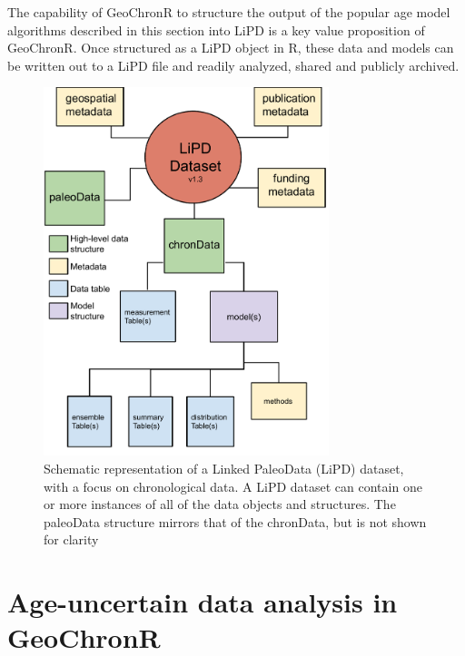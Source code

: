 \documentclass[gchron, manuscript]{copernicus}
\begin{document}
The capability of GeoChronR to structure the output of the popular age model algorithms described in this section into LiPD is a key value proposition of GeoChronR.
Once structured as a LiPD object in R, these data and models can be written out to a LiPD file and readily analyzed, shared and publicly archived.

\begin{figure}
\includegraphics[width=8.3cm]{LPD schematic 1.3 - chronData} \caption{Schematic representation of a Linked PaleoData (LiPD) dataset, with a focus on chronological data. A LiPD dataset can contain one or more instances of all of the data objects and structures. The paleoData structure mirrors that of the chronData, but is not shown for clarity}\label{fig:lipd-chron}
\end{figure}

\hypertarget{sec:age-uncertain-analysis}{%
\section{Age-uncertain data analysis in GeoChronR}\label{sec:age-uncertain-analysis}}
\end{document}
